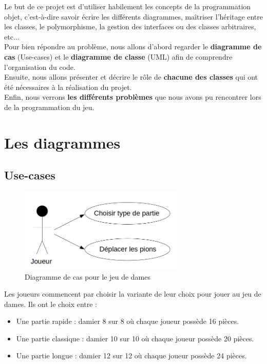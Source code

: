\documentclass[12,french]{report}
\begin{document}
Le but de ce projet est d'utiliser habilement les concepts de la programmation objet, c'est-à-dire savoir écrire les différents diagrammes, maîtriser l'héritage entre les classes, le polymorphisme, la gestion des interfaces ou des classes arbitraires, etc...\\

Pour bien répondre au problème, nous allons d'abord regarder le \textbf{diagramme de cas} (Use-cases) et le \textbf{diagramme de classe} (UML) afin de comprendre l'organisation du code.\\

Ensuite, nous allons présenter et décrire le rôle de \textbf{chacune des classes} qui ont été nécessaires à la réalisation du projet.\\

Enfin, nous verrons \textbf{les différents problèmes} que nous avons pu rencontrer lors de la programmation du jeu.


\chapter{Les diagrammes}

\section{Use-cases}

\begin{figure}[H]
	\center
	\includegraphics[width=0.7\textwidth]{./Images/Use-cases}
	\caption{Diagramme de cas pour le jeu de dames}
\end{figure}\vspace{0.2cm}

Les joueurs commencent par choisir la variante de leur choix pour jouer au jeu de dames. Ils ont le choix entre :

\begin{itemize}[label=\textbullet]
	\item Une partie rapide : damier 8 sur 8 où chaque joueur possède 16 pièces.
	\item Une partie classique : damier 10 sur 10 où chaque joueur possède 20 pièces.
	\item Une partie longue : damier 12 sur 12 où chaque joueur possède 24 pièces.
\end{itemize}\vspace{0.3cm}
\end{document}
